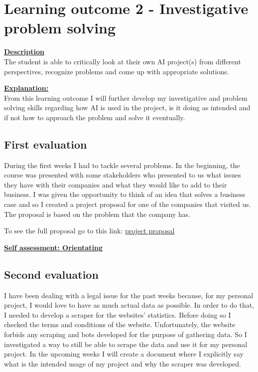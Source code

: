 \documentclass{article}
\begin{document}
	\section{Learning outcome 2 - Investigative problem solving}
	\underline{\textbf{Description}}\\
	The student is able to critically look at their own AI project(s) from different perspectives, 
	recognize problems and come up with appropriate solutions.
	
	\underline{\textbf{Explanation:}}\\
	From this learning outcome I will further develop my investigative and problem solving skills regarding 
	how AI is used in the project, is it doing as intended and if not how to approach the problem and solve it 
	eventually.
	
	\subsection{First evaluation}
	During the first weeks I had to tackle several problems. In the beginning, the course was presented with some stakeholders 
	who presented to us what issues they have with their companies and what they would like to add to their business. I was given 
	the opportunity to think of an idea that solves a business case and so I created a project proposal for one of the companies that visited us. 
	The proposal is based on the problem that the company has.
	
	To see the full proposal go to this link: \href{https://github.com/BurovDanil/MinorAI/blob/main/Documents/Project%20Proposal/Proposal.md}{project proposal}
	
	\underline{\textbf{Self assessment: Orientating}}
	
	\subsection{Second evaluation}
	I have been dealing with a legal issue for the past weeks because, for my personal project, I would love to have as much actual data as possible. 
	In order to do that, I needed to develop a scraper for the websites' statistics. Before doing so I checked the terms and conditions of the website. 
	Unfortunately, the website forbids any scraping and bots developed for the purpose of gathering data. So I investigated a way to still be able 
	to scrape the data and use it for my personal project. In the upcoming weeks I will create a document where I explicitly say what is the intended usage of 
	my project and why the scraper was developed.
	
\end{document}
